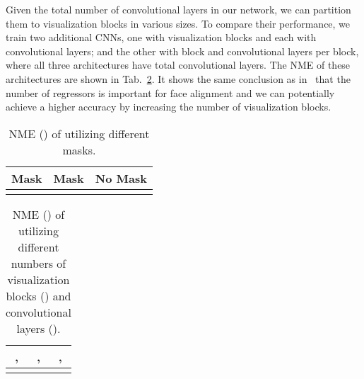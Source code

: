 Given the total number of  convolutional layers in our network, we can partition them to visualization blocks in various sizes.
To compare their performance, we train two additional CNNs, one with  visualization blocks and each with  convolutional layers; and the other with  block and  convolutional layers per block, where all three architectures have  total convolutional layers.
The NME of these architectures are shown in Tab.~\ref{table:VBNum}. 
It shows the same conclusion as in~\cite{burgos2013robust} that the number of regressors is important for face alignment and we can potentially achieve a higher accuracy by increasing the number of visualization blocks. 

\begin{table}[t!]\small
\caption{NME () of utilizing different masks.}
\begin{center}
\begin{tabular}{ c|c|c } 
 \hline
 Mask  & Mask  & No Mask \\ 
 \hline
  &  &  \\
 \hline  
\end{tabular}
\end{center}
\label{table:mask}\figvspace
\vspace{-3mm}
\end{table}

\begin{table}[t!]\small
\caption{NME () of utilizing different numbers of visualization blocks () and convolutional layers ().} \figvspace
\begin{center}
\begin{tabular}{ c|c|c } 
 \hline
  ,  &   ,  &   ,  \\ 
 \hline
  &  &  \\
 \hline  
\end{tabular}
\end{center}
\label{table:VBNum}\figvspace\vspace{-6mm}
\end{table}


